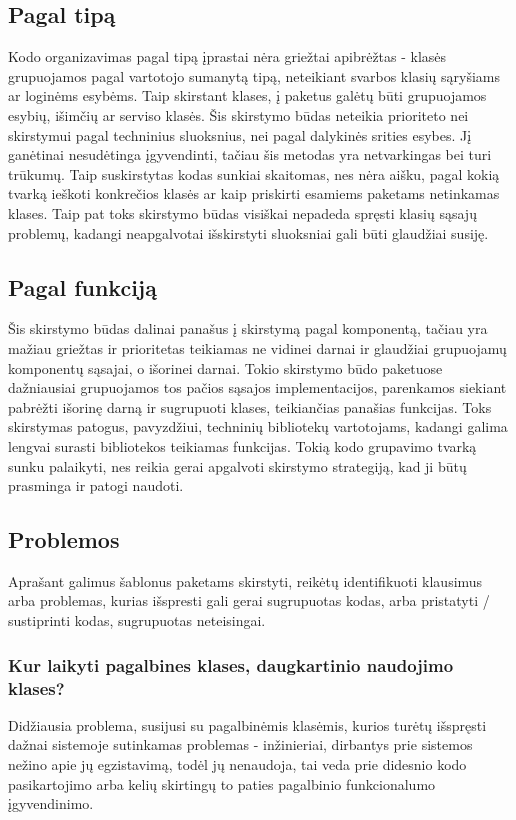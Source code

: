 \subsection{Pagal tipą}
Kodo organizavimas pagal tipą įprastai nėra griežtai apibrėžtas - klasės grupuojamos pagal vartotojo sumanytą tipą, neteikiant svarbos
klasių sąryšiams ar loginėms esybėms. Taip skirstant klases, į paketus galėtų būti grupuojamos esybių, išimčių ar serviso klasės. Šis skirstymo būdas
neteikia prioriteto nei skirstymui pagal techninius sluoksnius, nei pagal dalykinės srities esybes. Jį ganėtinai nesudėtinga įgyvendinti,
tačiau šis metodas yra netvarkingas bei turi trūkumų. Taip suskirstytas kodas sunkiai skaitomas, nes nėra aišku, pagal kokią tvarką
ieškoti konkrečios klasės ar kaip priskirti esamiems paketams netinkamas klases. Taip pat toks skirstymo būdas visiškai nepadeda spręsti
klasių sąsajų problemų, kadangi neapgalvotai išskirstyti sluoksniai gali būti glaudžiai susiję.

\subsection{Pagal funkciją}
Šis skirstymo būdas dalinai panašus į skirstymą pagal komponentą, tačiau yra mažiau griežtas ir
prioritetas teikiamas ne vidinei darnai ir glaudžiai grupuojamų
komponentų sąsajai, o išorinei darnai. Tokio skirstymo būdo paketuose dažniausiai grupuojamos tos pačios sąsajos implementacijos,
parenkamos siekiant pabrėžti išorinę darną ir sugrupuoti klases, teikiančias panašias funkcijas. Toks skirstymas patogus, pavyzdžiui,
techninių bibliotekų vartotojams, kadangi galima lengvai surasti bibliotekos teikiamas funkcijas. Tokią kodo grupavimo tvarką sunku palaikyti,
nes reikia gerai apgalvoti skirstymo strategiją, kad ji būtų prasminga ir patogi naudoti.



\subsection{Problemos}
Aprašant galimus šablonus paketams skirstyti, reikėtų identifikuoti klausimus arba problemas, kurias išspresti gali
gerai sugrupuotas kodas, arba pristatyti / sustiprinti kodas, sugrupuotas neteisingai.

\subsubsection{Kur laikyti pagalbines klases, daugkartinio naudojimo klases?}
Didžiausia problema, susijusi su pagalbinėmis klasėmis, kurios turėtų išspręsti dažnai sistemoje sutinkamas problemas -
inžinieriai, dirbantys prie sistemos nežino apie jų egzistavimą, todėl jų nenaudoja,
tai veda prie didesnio kodo pasikartojimo arba kelių skirtingų to paties pagalbinio funkcionalumo įgyvendinimo.

